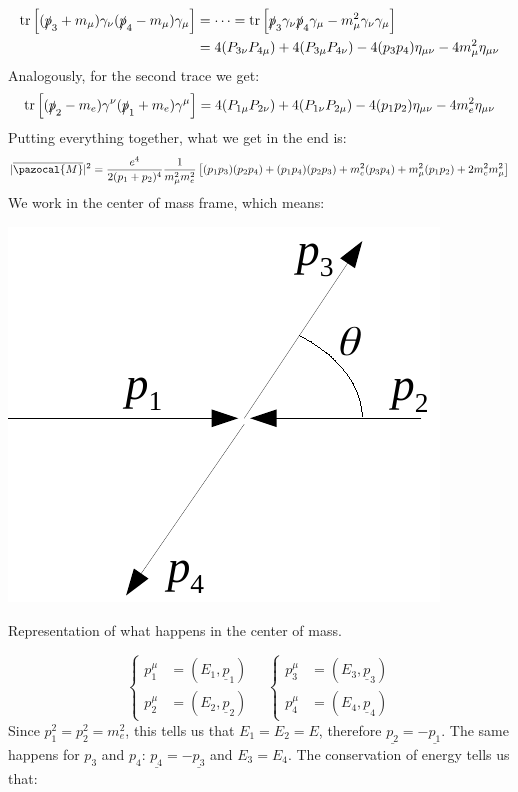 \documentclass[../main.tex]{subfiles}
\begin{document}
\begin{align*}
\tr\left[(\slashed{p}_3+m_\mu)\gamma_\nu(\slashed{p}_4-m_\mu)\gamma_\mu\right]&=\dots=\tr\left[\slashed{p}_3\gamma_\nu\slashed{p}_4\gamma_\mu-m_\mu^2\gamma_\nu\gamma_\mu\right]\\
&=4(P_{3\nu}P_{4\mu})+4(P_{3\mu}P_{4\nu})-4(p_3p_4)\eta_{\mu\nu}-4m_\mu^2\eta_{\mu\nu}
\end{align*}
Analogously, for the second trace we get:
\[
\tr\left[(\slashed{p}_2-m_e)\gamma^\nu(\slashed{p}_1+m_e)\gamma^\mu\right]=4(P_{1\mu}P_{2\nu})+4(P_{1\nu}P_{2\mu})-4(p_1p_2)\eta_{\mu\nu}-4m_e^2\eta_{\mu\nu}
\]
Putting everything together, what we get in the end is:
\[
|\overline{\pazocal{M}}|^2=\frac{e^4}{2(p_1+p_2)^4}\frac{1}{m_\mu^2m_e^2}\left[(p_1p_3)(p_2p_4)+(p_1p_4)(p_2p_3)+m_e^2(p_3p_4)+m_\mu^2(p_1p_2)+2m_e^2m_\mu^2\right]
\]
We work in the center of mass frame, which means:\begin{marginfigure}
\includegraphics{Images/cdm.pdf}
\caption{Representation of what happens in the center of mass.}
\end{marginfigure}
\[
\left\{
\begin{aligned}
p_1^\mu&=(E_1,\underline{p}_1)\\
p_2^\mu&=(E_2,\underline{p}_2)
\end{aligned}
\right.
\quad
\left\{
\begin{aligned}
p_3^\mu&=(E_3,\underline{p}_3)\\
p_4^\mu&=(E_4,\underline{p}_4)
\end{aligned}
\right.
\]
Since $p_1^2=p_2^2=m_e^2$, this tells us that $E_1=E_2=E$, therefore $\underline{p_2}=-\underline{p_1}$. The same happens for $p_3$ and $p_4$: $\underline{p_4}=-\underline{p_3}$ and $E_3=E_4$. The conservation of energy tells us that:
\end{document}
